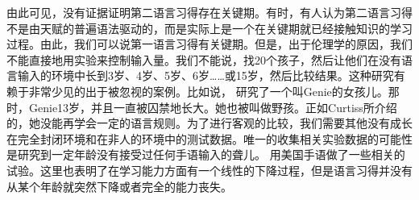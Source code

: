 由此可见，没有证据证明第二语言习得存在关键期。有时，有人认为第二语言习得不是由天赋的普遍语法驱动的，而是实际上是一个在关键期就已经接触知识的学习过程\citep[]{Lenneberg67a-u}。由此，我们可以说第一语言习得有关键期。但是，出于伦理学的原因，我们不能直接地用实验来控制输入量。我们不能说，找20个孩子，然后让他们在没有语言输入的环境中长到3岁、4岁、5岁、6岁……或15岁，然后比较结果。这种研究有赖于非常少见的出于被忽视的案例。比如说， \citet{Curtiss77a-u}研究了一个叫Genie的女孩儿。那时，Genie13岁，并且一直被囚禁地长大。她也被叫做野孩。正如Curtiss所介绍的，她没能再学会一定的语言规则。为了进行客观的比较，我们需要其他没有成长在完全封闭环境和在非人的环境中的测试数据。唯一的收集相关实验数据的可能性是研究到一定年龄没有接受过任何手语输入的聋儿。 \citet[]{JN89a}用美国手语做了一些相关的试验。这里也表明了在学习能力方面有一个线性的下降过程，但是语言习得并没有从某个年龄就突然下降或者完全的能力丧失。

